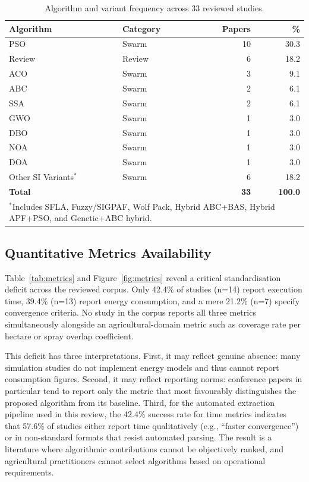 \documentclass[review,3p,times]{elsarticle}
\begin{document}
\begin{table}[htbp]
\centering
\caption{Algorithm and variant frequency across 33 reviewed studies.}
\label{tab:algorithms}
\begin{tabular}{llrr}
\toprule
\textbf{Algorithm} & \textbf{Category} & \textbf{Papers} & \textbf{\%} \\
\midrule
PSO & Swarm & 10 & 30.3 \\
Review & Review & 6 & 18.2 \\
ACO & Swarm & 3 & 9.1 \\
ABC & Swarm & 2 & 6.1 \\
SSA & Swarm & 2 & 6.1 \\
GWO & Swarm & 1 & 3.0 \\
DBO & Swarm & 1 & 3.0 \\
NOA & Swarm & 1 & 3.0 \\
DOA & Swarm & 1 & 3.0 \\
Other SI Variants$^*$ & Swarm & 6 & 18.2 \\
\midrule
\textbf{Total} & & \textbf{33} & \textbf{100.0} \\
\bottomrule
\multicolumn{4}{l}{$^*$Includes SFLA, Fuzzy/SIGPAF, Wolf Pack, Hybrid ABC+BAS, Hybrid APF+PSO, and Genetic+ABC hybrid.}
\end{tabular}
\end{table}

\subsection{Quantitative Metrics Availability}
Table~\ref{tab:metrics} and Figure~\ref{fig:metrics} reveal a critical standardisation deficit across the reviewed corpus. Only 42.4\% of studies (n=14) report execution time, 39.4\% (n=13) report energy consumption, and a mere 21.2\% (n=7) specify convergence criteria. No study in the corpus reports all three metrics simultaneously alongside an agricultural-domain metric such as coverage rate per hectare or spray overlap coefficient.

This deficit has three interpretations. First, it may reflect genuine absence: many simulation studies do not implement energy models and thus cannot report consumption figures. Second, it may reflect reporting norms: conference papers in particular tend to report only the metric that most favourably distinguishes the proposed algorithm from its baseline. Third, for the automated extraction pipeline used in this review, the 42.4\% success rate for time metrics indicates that 57.6\% of studies either report time qualitatively (e.g., ``faster convergence'') or in non-standard formats that resist automated parsing. The result is a literature where algorithmic contributions cannot be objectively ranked, and agricultural practitioners cannot select algorithms based on operational requirements.
\end{document}
